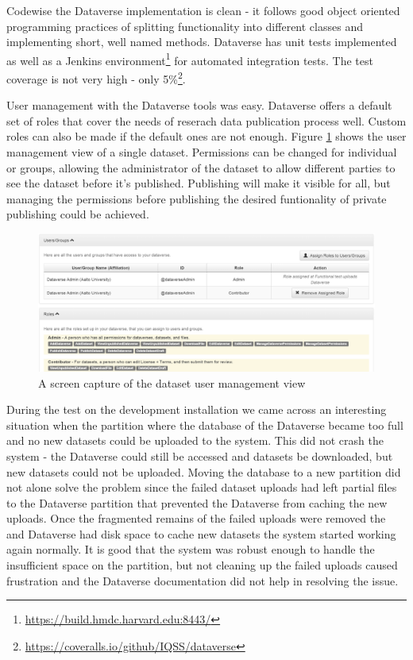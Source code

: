 Codewise the Dataverse implementation is clean - it follows good object
oriented programming practices of splitting functionality into different
classes and implementing short, well named methods. Dataverse has unit
tests implemented as well as a Jenkins
environment\footnote{\url{https://build.hmdc.harvard.edu:8443/}} for automated
integration tests. The test coverage is not very high - only
5\%\footnote{\url{https://coveralls.io/github/IQSS/dataverse}}.

User management with the Dataverse tools was easy. Dataverse offers a default
set of roles that cover the needs of reserach data publication process well.
Custom roles can also be made if the default ones are not enough. Figure
\ref{fig:admin} shows the user management view of a single dataset. Permissions
can be changed for individual or groups, allowing the administrator of the
dataset to allow different parties to see the dataset before it's published.
Publishing will make it visible for all, but managing the permissions before
publishing the desired funtionality of private publishing could be achieved.

\begin{figure}
    \begin{centering}
        \includegraphics[width=\textwidth]{images/admin}
    \end{centering}
    \caption{A screen capture of the dataset user management view}
    \label{fig:admin}
\end{figure}

During the test on the development installation we came across an interesting
situation when the partition where the database of the Dataverse became too
full and no new datasets could be uploaded to the system. This did not crash
the system - the Dataverse could still be accessed and datasets be downloaded,
but new datasets could not be uploaded. Moving the database to a new partition
did not alone solve the problem since the failed dataset uploads had left
partial files to the Dataverse partition that prevented the Dataverse from
caching the new uploads. Once the fragmented remains of the failed uploads
were removed the and Dataverse had disk space to cache new datasets the system
started working again normally. It is good that the system was robust enough
to handle the insufficient space on the partition, but not cleaning up the
failed uploads caused frustration and the Dataverse documentation did not
help in resolving the issue.

